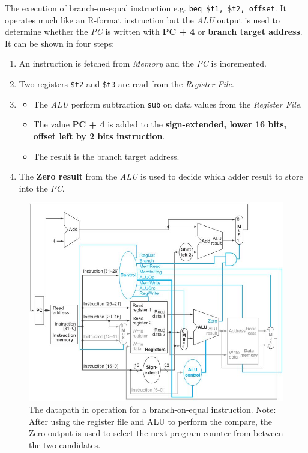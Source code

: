 \documentclass[10pt,a4paper]{article}
\begin{document}
The execution of branch-on-equal instruction e.g. \texttt{beq \$t1, \$t2, offset}. It operates much
like an R-format instruction but the \textit{ALU} output is used to determine whether the
\textit{PC} is written with \textbf{PC + 4} or \textbf{branch target address}. It can be shown in
four steps:
\begin{enumerate}
    \item An instruction is fetched from \textit{Memory} and the \textit{PC} is incremented.
    \item Two registers \texttt{\$t2} and \texttt{\$t3} are read from the \textit{Register File}.
    \item 
    \begin{itemize}
        \item The \textit{ALU} perform subtraction \texttt{sub} on data values from the \textit{Register
        File}.
        \item The value \textbf{PC + 4} is added to the \textbf{sign-extended, lower 16 bits,
        offset left by 2 bits instruction}. 
        \item The result is the branch target address.
    \end{itemize} 
    \item The \textbf{Zero result} from the \textit{ALU} is used to decide which adder result to store 
    into the \textit{PC}.
\end{enumerate}
\begin{figure} [h!]
    \centering
    \includegraphics[scale=0.7]{beq.JPG}
    \caption{The datapath in operation for a branch-on-equal instruction. Note: After using the register file and ALU to perform the compare, the Zero output is used to select the next program 
    counter from between the two candidates.}
\end{figure}
\end{document}
